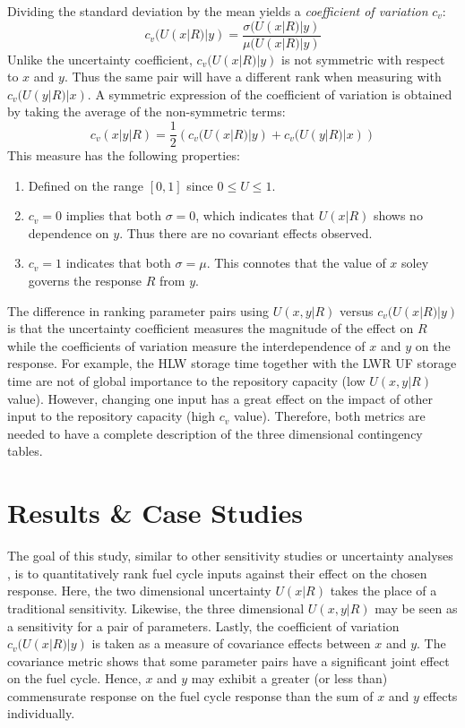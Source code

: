 Dividing the standard deviation by the mean yields a \emph{coefficient of variation} $c_v$:
\begin{equation} c_v(U(x|R)|y) = \frac{\sigma(U(x|R)|y)}{\mu(U(x|R)|y)} \end{equation}
Unlike the uncertainty coefficient, $c_v(U(x|R)|y)$ is not symmetric with respect to $x$ and $y$.  
Thus the same pair will have a different rank when measuring
with $c_v(U(y|R)|x)$.  A symmetric expression of the coefficient of variation is obtained by taking 
the average of the non-symmetric terms:
\begin{equation}
c_v(x|y|R) = \frac{1}{2} \left(c_v(U(x|R)|y) + c_v(U(y|R)|x)\right)
\end{equation}
This measure has the following properties:
\begin{enumerate}
    \item Defined on the range $[0, 1]$ since $0 \le U \le 1$.
    \item $c_v = 0$ implies that both $\sigma = 0$, which indicates that $U(x|R)$
        shows no dependence on $y$.  Thus there are no covariant effects observed.
    \item $c_v = 1$ indicates that both $\sigma = \mu$.  This connotes
        that the value of $x$ soley governs the response $R$ from $y$.
\end{enumerate}

The difference in ranking parameter pairs using $U(x,y|R)$ versus $c_v(U(x|R)|y)$ is that the uncertainty 
coefficient measures the magnitude of the effect on $R$ while the coefficients of variation measure the 
interdependence of $x$ and $y$ on the response. For example, the HLW storage time together with the LWR UF 
storage time are not of global importance to the repository capacity (low $U(x,y|R)$ value).
However, changing one input has a great effect on the impact of other input to the repository capacity 
(high $c_v$ value). Therefore, both metrics are needed to have a complete description of the three 
dimensional contingency tables.



\section{Results \& Case Studies}
\label{cts_sec:results}

The goal of this study, similar to other sensitivity studies \cite{Scopatz2010b} or uncertainty 
analyses \cite{Barratt2004}, is to quantitatively rank fuel cycle inputs against their effect on 
the chosen response.  Here, the two dimensional uncertainty $U(x|R)$ takes the place of a 
traditional sensitivity.  Likewise, the three dimensional $U(x,y|R)$ may be seen as a sensitivity 
for a pair of parameters.  Lastly, the coefficient of variation $c_v(U(x|R)|y)$ is taken as a 
measure of covariance effects between $x$ and $y$.  The covariance metric shows that some parameter 
pairs have a significant joint effect on the fuel cycle. Hence, $x$ and $y$ may exhibit a greater 
(or less than) commensurate response on the fuel cycle response than the sum of $x$ and $y$ 
effects individually.


